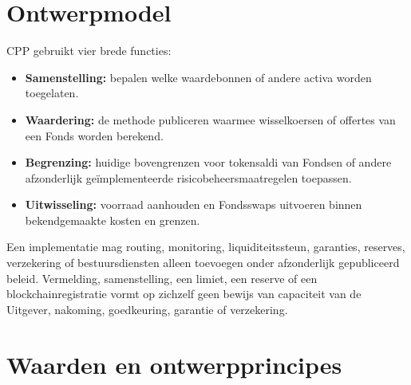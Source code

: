 \documentclass[11pt]{article}
\begin{document}
\section*{Ontwerpmodel}

CPP gebruikt vier brede functies:

\begin{itemize}[leftmargin=*]
\item \textbf{Samenstelling:} bepalen welke waardebonnen of andere activa worden toegelaten.
\item \textbf{Waardering:} de methode publiceren waarmee wisselkoersen of offertes van een Fonds worden berekend.
\item \textbf{Begrenzing:} huidige bovengrenzen voor tokensaldi van Fondsen of andere afzonderlijk geïmplementeerde risicobeheersmaatregelen toepassen.
\item \textbf{Uitwisseling:} voorraad aanhouden en Fondsswaps uitvoeren binnen bekendgemaakte kosten en grenzen.
\end{itemize}
Een implementatie mag routing, monitoring, liquiditeitssteun, garanties, reserves, verzekering of bestuursdiensten alleen toevoegen onder afzonderlijk gepubliceerd beleid. Vermelding, samenstelling, een limiet, een reserve of een blockchainregistratie vormt op zichzelf geen bewijs van capaciteit van de Uitgever, nakoming, goedkeuring, garantie of verzekering.

\section*{Waarden en ontwerpprincipes}
\end{document}
